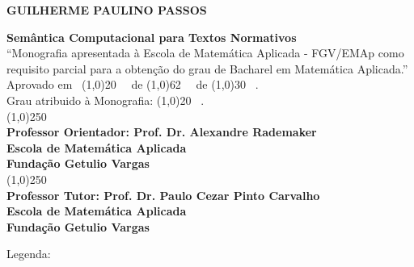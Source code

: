 \documentclass[12pt, a4paper, twoside]{article}
\newcommand{\fixed}[1]{\todo[color=Green]{#1}}
\theoremstyle{definition}
\newcommand{\supervisor}{Alexandre Rademaker}
\begin{document}
\begin{titlepage}
 \begin{center}
 
  {\bf \large \uppercase{Guilherme Paulino Passos}}\\[0.3cm]

  \vspace{25 mm}

  {\bf \large Semântica Computacional para Textos Normativos}\\[3cm]

  {“Monografia apresentada à Escola de Matemática Aplicada  - FGV/EMAp como requisito parcial para a obtenção do grau de Bacharel em Matemática Aplicada.”}\\[3cm]


  {Aprovado em \ \line(1,0){20} \ \ de \line(1,0){62} \ \ de \line(1,0){30} \ .}\\[0.1cm]
  {Grau atribuido à Monografia: \line(1,0){20} \ . }\\[3cm]
  
  
  {\line(1,0){250}}\\
  {\bf Professor Orientador: Prof. Dr. \supervisor}\\[0.1cm]
  {\bf Escola de Matemática Aplicada}\\[0.1cm]
  {\bf Fundação Getulio Vargas}\\[1.5cm]
  
    {\line(1,0){250}}\\
    {\bf Professor Tutor: Prof. Dr. Paulo Cezar Pinto Carvalho}\\[0.1cm]
    {\bf Escola de Matemática Aplicada}\\[0.1cm]
    {\bf Fundação Getulio Vargas}
 \end{center}
\end{titlepage}

\newpage\null\thispagestyle{empty}\newpage


\tableofcontents

\newpage

Legenda:
\fixed{fixed}
\listoftodos

%
%
%
\end{document}
